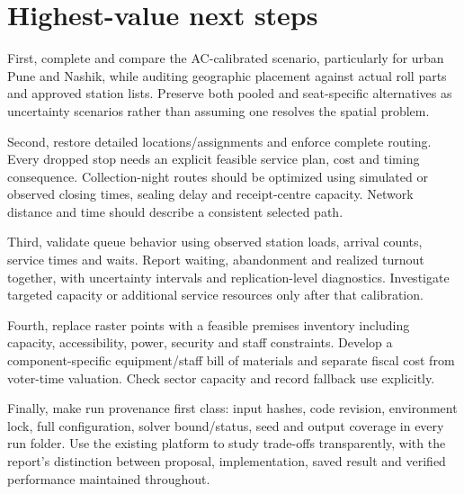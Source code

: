 \documentclass[11pt,a4paper,oneside]{report}
\begin{document}
\section{Highest-value next steps}
First, complete and compare the AC-calibrated scenario, particularly for urban Pune and Nashik, while auditing geographic placement against actual roll parts and approved station lists. Preserve both pooled and seat-specific alternatives as uncertainty scenarios rather than assuming one resolves the spatial problem.

Second, restore detailed locations/assignments and enforce complete routing. Every dropped stop needs an explicit feasible service plan, cost and timing consequence. Collection-night routes should be optimized using simulated or observed closing times, sealing delay and receipt-centre capacity. Network distance and time should describe a consistent selected path.

Third, validate queue behavior using observed station loads, arrival counts, service times and waits. Report waiting, abandonment and realized turnout together, with uncertainty intervals and replication-level diagnostics. Investigate targeted capacity or additional service resources only after that calibration.

Fourth, replace raster points with a feasible premises inventory including capacity, accessibility, power, security and staff constraints. Develop a component-specific equipment/staff bill of materials and separate fiscal cost from voter-time valuation. Check sector capacity and record fallback use explicitly.

Finally, make run provenance first class: input hashes, code revision, environment lock, full configuration, solver bound/status, seed and output coverage in every run folder. Use the existing platform to study trade-offs transparently, with the report's distinction between proposal, implementation, saved result and verified performance maintained throughout.

\appendix
\end{document}
